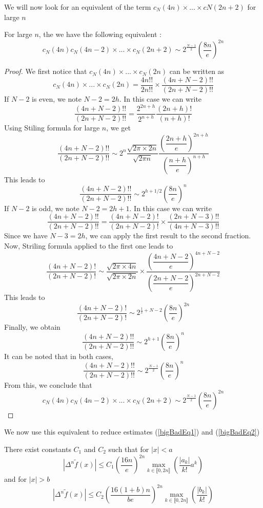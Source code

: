 \documentclass[11pt,a4paper]{article}
\begin{document}
We will now look for an equivalent of the term $c_N(4n) \times ... \times cN(2n+2)$ for large $n$ 
\begin{Lem}

For large $n$, the we have the following equivalent : \[c_N(4n)c_N(4n-2)\times...\times c_N(2n+2) \sim 2^{\frac{N-1}{2}}\left(\dfrac{8n}{e}\right)^{2n}\]

\begin{proof}
We first notice that $c_N(4n)\times...\times c_N(2n)$ can be written as \[c_N(4n)\times...\times c_N(2n) = \dfrac{4n!!}{2n!!}\times \dfrac{\left(4n+N-2\right)!!}{\left(2n+N-2\right)!!}\]
If $N-2$ is even, we note $N-2 = 2h$. In this case we can write 
\[ \dfrac{(4n+N-2)!!}{(2n+N-2)!!} = \dfrac{2^{2n+h}}{2^{n+h}}\dfrac{(2n+h)!}{(n+h)!}\]
Using Stiling formula for large $n$, we get
\[\dfrac{(4n+N-2)!!}{(2n+N-2)!!} \sim 2^n\dfrac{\sqrt{2\pi\times 2n}}{\sqrt{2\pi n}} \dfrac{\left(\dfrac{2n+h}{e}\right)^{2n+h}}{\left(\dfrac{n+h}{e}\right)^{n+h}}\]
This leads to 
\[\dfrac{(4n+N-2)!!}{(2n+N-2)!!} \sim 2^{h+1/2} \left(\dfrac{8n}{e}\right)^n \]
If $N-2$ is odd, we note $N-2 = 2h+1$. In this case we can write 
\[ \dfrac{(4n+N-2)!!}{(2n+N-2)!!} = \dfrac{(4n+N-2)!}{(2n+N-2)!} \times \dfrac{(2n+N-3)!!}{(4n + N-3)!!} \]
Since we have $N-3 = 2h$, we can apply the first result to the second fraction. Now, Striling formula applied to the first one leads to 
\[\dfrac{(4n+N-2)!}{(2n+N-2)!} \sim \dfrac{\sqrt{2\pi \times 4n}}{\sqrt{2\pi\times 2n}} \times \dfrac{\left(\dfrac{4n+N-2}{e}\right)^{4n+N-2}}{\left(\dfrac{2n+N-2}{e}\right)^{2n+N-2}}\]
This leads to 
\[\dfrac{(4n+N-2)!}{(2n+N-2)!} \sim 2^{\frac{1}{2}+N-2}\left(\dfrac{8n}{e}\right)^{2n}\]
Finally, we obtain 
\[\dfrac{(4n+N-2)!!}{(2n+N-2)!!} \sim 2^{h+1}\left(\dfrac{8n}{e}\right)^n\]
It can be noted that in both cases, 
\[\dfrac{(4n+N-2)!!}{(2n+N-2)!!} \sim 2^{\frac{N-1}{2}} \left(\frac{8n}{e}\right)^n\]
From this, we conclude that 
\[c_N(4n)c_N(4n-2) \times ... \times c_N(2n+2) \sim 2^{\frac{N-1}{2}}\left(\dfrac{8n}{e}\right)^{2n}\]
\end{proof}
\end{Lem}


We now use this equivalent to reduce estimates (\ref{bigBadEq1}) and (\ref{bigBadEq2})
\begin{Lem} 
There exist constants $C_1$ and $C_2$ such that for $|x|<a$
\begin{equation}
|\Delta^n \tilde{f}(x)| \leq  C_1\left( \frac{16n}{e}\right)^{2n}\max_{k\in\llbracket 0,2n\rrbracket}\left(\dfrac{|a_k|}{k!}a^k\right)
\label{bigBadEq1Reduced}
\end{equation}
and for $|x| > b$ 
\begin{equation}
|\Delta^n \tilde{f}(x)| \leq C_2\left(\dfrac{16(1+b)n}{be}\right)^{2n}\max_{k\in\llbracket 0,2n\rrbracket}\left(\dfrac{|b_k|}{k!}\right) 
\label{bigBadEq2Reduced}
\end{equation}
\label{LemAkDeltanf}
\end{Lem}
\end{document}
